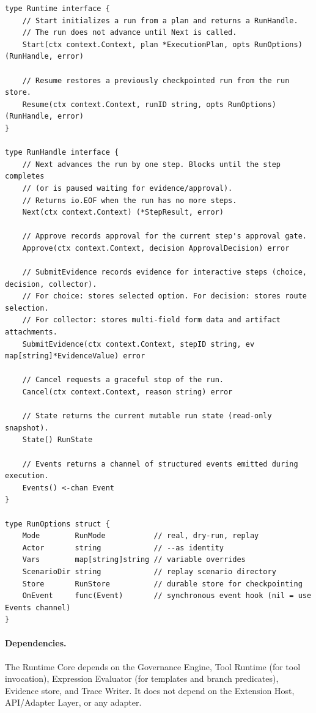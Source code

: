 \begin{verbatim}
type Runtime interface {
    // Start initializes a run from a plan and returns a RunHandle.
    // The run does not advance until Next is called.
    Start(ctx context.Context, plan *ExecutionPlan, opts RunOptions) (RunHandle, error)

    // Resume restores a previously checkpointed run from the run store.
    Resume(ctx context.Context, runID string, opts RunOptions) (RunHandle, error)
}

type RunHandle interface {
    // Next advances the run by one step. Blocks until the step completes
    // (or is paused waiting for evidence/approval).
    // Returns io.EOF when the run has no more steps.
    Next(ctx context.Context) (*StepResult, error)

    // Approve records approval for the current step's approval gate.
    Approve(ctx context.Context, decision ApprovalDecision) error

    // SubmitEvidence records evidence for interactive steps (choice, decision, collector).
    // For choice: stores selected option. For decision: stores route selection.
    // For collector: stores multi-field form data and artifact attachments.
    SubmitEvidence(ctx context.Context, stepID string, ev map[string]*EvidenceValue) error

    // Cancel requests a graceful stop of the run.
    Cancel(ctx context.Context, reason string) error

    // State returns the current mutable run state (read-only snapshot).
    State() RunState

    // Events returns a channel of structured events emitted during execution.
    Events() <-chan Event
}

type RunOptions struct {
    Mode        RunMode           // real, dry-run, replay
    Actor       string            // --as identity
    Vars        map[string]string // variable overrides
    ScenarioDir string            // replay scenario directory
    Store       RunStore          // durable store for checkpointing
    OnEvent     func(Event)       // synchronous event hook (nil = use Events channel)
}
\end{verbatim}

\paragraph{Dependencies.}
The Runtime Core depends on the Governance Engine, Tool Runtime (for tool invocation),
Expression Evaluator (for templates and branch predicates), Evidence store, and Trace Writer.
It does not depend on the Extension Host, API/Adapter Layer, or any adapter.

